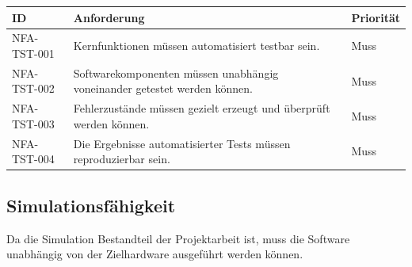 \begin{longtable}[]{@{}
  >{\raggedright\arraybackslash}p{}
  >{\raggedright\arraybackslash}p{}
  >{\raggedright\arraybackslash}p{}@{}}
\toprule\noalign{}
\begin{minipage}[b]{\linewidth}\raggedright
ID
\end{minipage} & \begin{minipage}[b]{\linewidth}\raggedright
Anforderung
\end{minipage} & \begin{minipage}[b]{\linewidth}\raggedright
Priorität
\end{minipage} \\
\midrule\noalign{}
\endhead
\bottomrule\noalign{}
\endlastfoot
NFA-TST-001 & Kernfunktionen müssen automatisiert testbar sein. &
Muss \\
NFA-TST-002 & Softwarekomponenten müssen unabhängig voneinander getestet
werden können. & Muss \\
NFA-TST-003 & Fehlerzustände müssen gezielt erzeugt und überprüft werden
können. & Muss \\
NFA-TST-004 & Die Ergebnisse automatisierter Tests müssen reproduzierbar
sein. & Muss \\
\end{longtable}

\subsection{Simulationsfähigkeit}\label{simulationsfuxe4higkeit}

Da die Simulation Bestandteil der Projektarbeit ist, muss die Software
unabhängig von der Zielhardware ausgeführt werden können.


